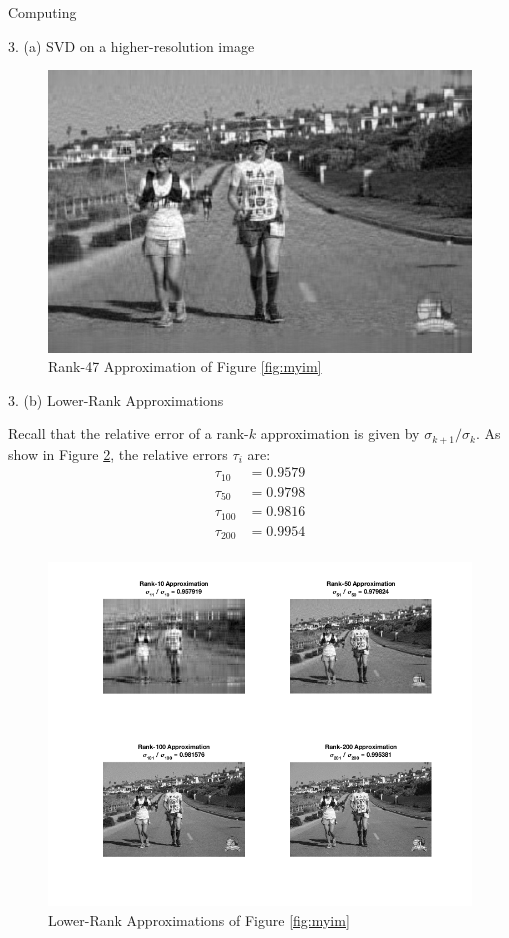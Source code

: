 \begin{section}{Computing}
\begin{homeworkSection}{3. (a) SVD on a higher-resolution image}
\begin{figure}[H]
\centering
\includegraphics[width=0.90\columnwidth]{../data/rank_47_approx}
\caption{Rank-47 Approximation of Figure \ref{fig:myim}}
\label{fig:rank_47}
\end{figure}

\end{homeworkSection}

\begin{homeworkSection}{3. (b) Lower-Rank Approximations}

Recall that the relative error of a rank-$k$ approximation is given by $\sigma_{k+1} / \sigma_k$. As show in Figure \ref{fig:rank_approxs}, the relative errors $\tau_i$ are:
\begin{align*}
    \tau_{10} &= 0.9579 \\ 
    \tau_{50} &= 0.9798 \\ 
    \tau_{100} &= 0.9816 \\ 
    \tau_{200} &= 0.9954 \\ 
\end{align*}

\begin{figure}[H]
\centering
\includegraphics[width=0.9999\columnwidth]{../data/lower_rank_approxs}
\caption{Lower-Rank Approximations of Figure \ref{fig:myim}}
\label{fig:rank_approxs}
\end{figure}



\end{homeworkSection}
\end{section}
